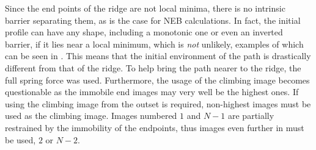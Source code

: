 Since the end points of the ridge are not local minima, there is no intrinsic barrier separating them, as is the case for NEB calculations.
In fact, the initial profile can have any shape, including a monotonic one or even an inverted barrier, if it lies near a local minimum, which is \emph{not} unlikely, examples of which can be seen in .
This means that the initial environment of the path is drastically different from that of the ridge.
To help bring the path nearer to the ridge, the full spring force was used.
Furthermore, the usage of the climbing image becomes questionable as the immobile end images may very well be the highest ones.
If using the climbing image from the outset is required, non-highest images must be used as the climbing image.
Images numbered $1$ and $N-1$ are partially restrained by the immobility of the endpoints, thus images even further in must be used, $2$ or $N-2$.
